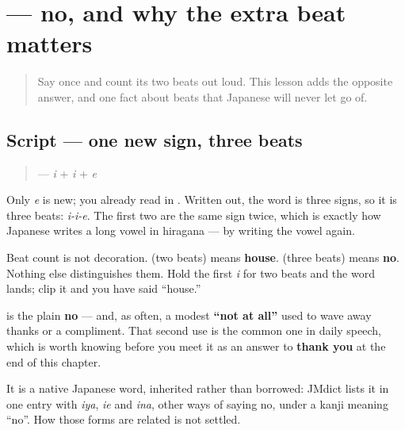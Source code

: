 \section[\texorpdfstring{\ja{いいえ} (iie)}{いいえ (iie)}]{ — no, and why the extra beat matters}

\label{lesson:JA-C01-iie}



\begin{quote}
Say \textbf{} once and count its two beats out loud. This lesson adds the opposite answer, and one fact about beats that Japanese will never let go of.
\end{quote}

\subsection*{Script — one new sign, three beats}
\begin{quote}
\textbf{} — \textbf{} \emph{i} + \textbf{} \emph{i} + \textbf{} \emph{e}
\end{quote}

Only \textbf{} \emph{e} is new; \textbf{} you already read in \textbf{}. Written out, the word is three signs, so it is three beats: \emph{i-i-e}. The first two are the same sign twice, which is exactly how Japanese writes a long vowel in hiragana — by writing the vowel again.

Beat count is not decoration. \textbf{} (two beats) means \textbf{house}. \textbf{} (three beats) means \textbf{no}. Nothing else distinguishes them. Hold the first \emph{i} for two beats and the word lands; clip it and you have said \textquotedblleft{}house.\textquotedblright{}

\begin{cousinweb}
\textbf{} is the plain \textbf{no} — and, as often, a modest \textbf{\textquotedblleft{}not at all\textquotedblright{}} used to wave away thanks or a compliment. That second use is the common one in daily speech, which is worth knowing before you meet it as an answer to \textbf{thank you} at the end of this chapter.

It is a native Japanese word, inherited rather than borrowed: JMdict lists it in one entry with \emph{iya}, \emph{ie} and \emph{ina}, other ways of saying no, under a kanji meaning \textquotedblleft{}no\textquotedblright{}. How those forms are related is not settled.
\end{cousinweb}

